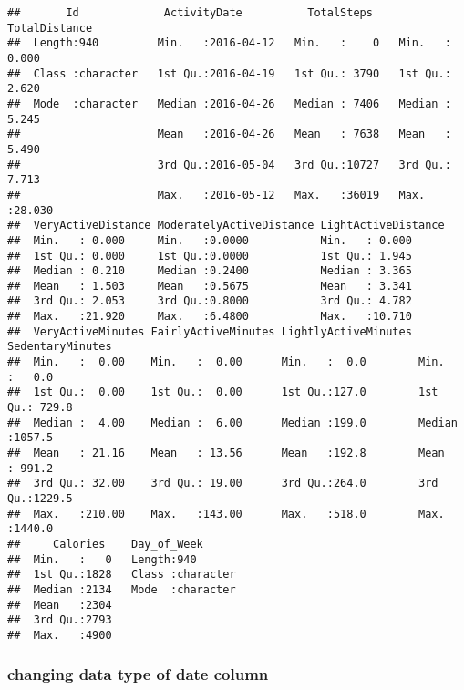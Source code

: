 \documentclass[
]{article}
\begin{document}
\begin{verbatim}
##       Id             ActivityDate          TotalSteps    TotalDistance   
##  Length:940         Min.   :2016-04-12   Min.   :    0   Min.   : 0.000  
##  Class :character   1st Qu.:2016-04-19   1st Qu.: 3790   1st Qu.: 2.620  
##  Mode  :character   Median :2016-04-26   Median : 7406   Median : 5.245  
##                     Mean   :2016-04-26   Mean   : 7638   Mean   : 5.490  
##                     3rd Qu.:2016-05-04   3rd Qu.:10727   3rd Qu.: 7.713  
##                     Max.   :2016-05-12   Max.   :36019   Max.   :28.030  
##  VeryActiveDistance ModeratelyActiveDistance LightActiveDistance
##  Min.   : 0.000     Min.   :0.0000           Min.   : 0.000     
##  1st Qu.: 0.000     1st Qu.:0.0000           1st Qu.: 1.945     
##  Median : 0.210     Median :0.2400           Median : 3.365     
##  Mean   : 1.503     Mean   :0.5675           Mean   : 3.341     
##  3rd Qu.: 2.053     3rd Qu.:0.8000           3rd Qu.: 4.782     
##  Max.   :21.920     Max.   :6.4800           Max.   :10.710     
##  VeryActiveMinutes FairlyActiveMinutes LightlyActiveMinutes SedentaryMinutes
##  Min.   :  0.00    Min.   :  0.00      Min.   :  0.0        Min.   :   0.0  
##  1st Qu.:  0.00    1st Qu.:  0.00      1st Qu.:127.0        1st Qu.: 729.8  
##  Median :  4.00    Median :  6.00      Median :199.0        Median :1057.5  
##  Mean   : 21.16    Mean   : 13.56      Mean   :192.8        Mean   : 991.2  
##  3rd Qu.: 32.00    3rd Qu.: 19.00      3rd Qu.:264.0        3rd Qu.:1229.5  
##  Max.   :210.00    Max.   :143.00      Max.   :518.0        Max.   :1440.0  
##     Calories    Day_of_Week       
##  Min.   :   0   Length:940        
##  1st Qu.:1828   Class :character  
##  Median :2134   Mode  :character  
##  Mean   :2304                     
##  3rd Qu.:2793                     
##  Max.   :4900
\end{verbatim}

\hypertarget{changing-data-type-of-date-column}{%
\subsubsection{changing data type of date
column}\label{changing-data-type-of-date-column}}
\end{document}

